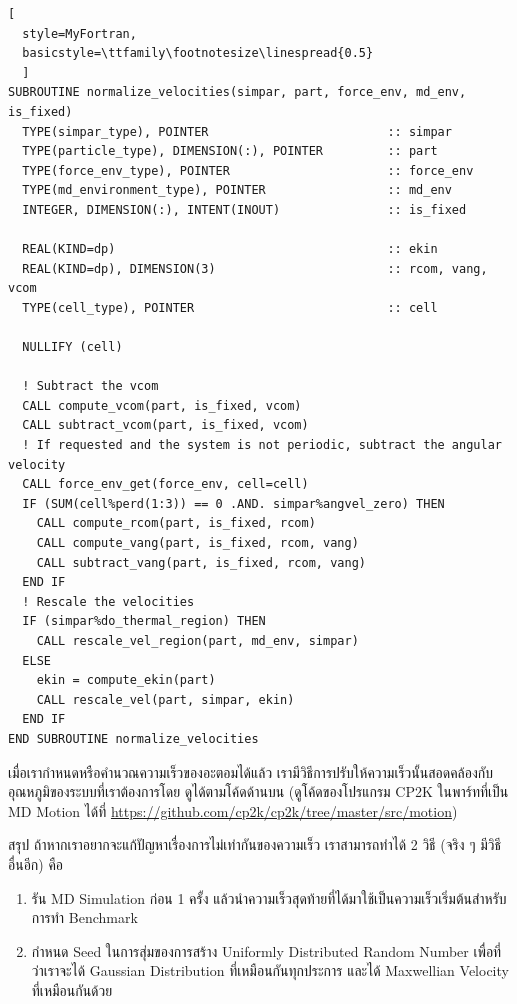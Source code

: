 \begin{lstlisting}[
  style=MyFortran,
  basicstyle=\ttfamily\footnotesize\linespread{0.5}
  ]
SUBROUTINE normalize_velocities(simpar, part, force_env, md_env, is_fixed)
  TYPE(simpar_type), POINTER                         :: simpar
  TYPE(particle_type), DIMENSION(:), POINTER         :: part
  TYPE(force_env_type), POINTER                      :: force_env
  TYPE(md_environment_type), POINTER                 :: md_env
  INTEGER, DIMENSION(:), INTENT(INOUT)               :: is_fixed

  REAL(KIND=dp)                                      :: ekin
  REAL(KIND=dp), DIMENSION(3)                        :: rcom, vang, vcom
  TYPE(cell_type), POINTER                           :: cell

  NULLIFY (cell)

  ! Subtract the vcom
  CALL compute_vcom(part, is_fixed, vcom)
  CALL subtract_vcom(part, is_fixed, vcom)
  ! If requested and the system is not periodic, subtract the angular velocity
  CALL force_env_get(force_env, cell=cell)
  IF (SUM(cell%perd(1:3)) == 0 .AND. simpar%angvel_zero) THEN
    CALL compute_rcom(part, is_fixed, rcom)
    CALL compute_vang(part, is_fixed, rcom, vang)
    CALL subtract_vang(part, is_fixed, rcom, vang)
  END IF
  ! Rescale the velocities
  IF (simpar%do_thermal_region) THEN
    CALL rescale_vel_region(part, md_env, simpar)
  ELSE
    ekin = compute_ekin(part)
    CALL rescale_vel(part, simpar, ekin)
  END IF
END SUBROUTINE normalize_velocities
\end{lstlisting}

\noindent เมื่อเรากำหนดหรือคำนวณความเร็วของอะตอมได้แล้ว เรามีวิธีการปรับให้ความเร็วนั้นสอดคล้องกับอุณหภูมิของระบบที่เราต้องการโดย%
ดูได้ตามโค้ดด้านบน (ดูโค้ดของโปรแกรม CP2K ในพาร์ทที่เป็น MD Motion ได้ที่
\url{https://github.com/cp2k/cp2k/tree/master/src/motion})

สรุป ถ้าหากเราอยากจะแก้ปัญหาเรื่องการไม่เท่ากันของความเร็ว เราสามารถทำได้ 2 วิธี (จริง ๆ มีวิธีอื่นอีก) คือ

\begin{enumerate}[topsep=0pt,noitemsep]
  \setlength\itemsep{1em}
  \item รัน MD Simulation ก่อน 1 ครั้ง แล้วนำความเร็วสุดท้ายที่ได้มาใช้เป็นความเร็วเริ่มต้นสำหรับการทำ Benchmark

  \item กำหนด Seed ในการสุ่มของการสร้าง Uniformly Distributed Random Number เพื่อที่ว่าเราจะได้ Gaussian Distribution
        ที่เหมือนกันทุกประการ และได้ Maxwellian Velocity ที่เหมือนกันด้วย
\end{enumerate}

